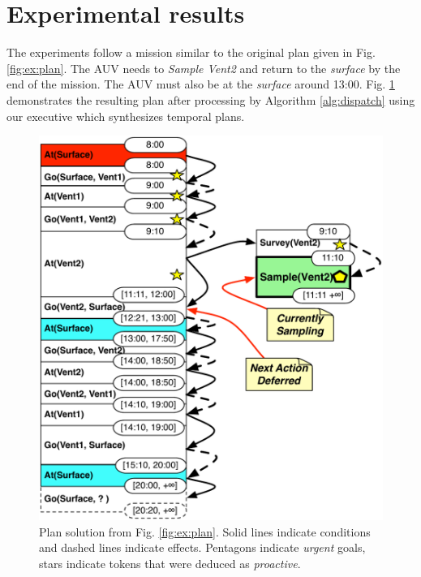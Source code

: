 \section{Experimental results}
\label{sec:exp}

The experiments follow a mission similar to the original plan given in
Fig. \ref{fig:ex:plan}. The AUV needs to {\em Sample Vent2} and return
to the {\em surface} by the end of the mission. The AUV must also be
at the {\em surface} around
13:00. %
Fig. \ref{fig:ex:mixed1} demonstrates the resulting plan after
processing by Algorithm \ref{alg:dispatch} using our executive \rx
which synthesizes temporal plans.

\begin{figure}[!htbp]
  \centering
  \includegraphics[width=0.9\columnwidth]{figs/example_MixedInitial}
  \caption{\small Plan solution from Fig. \ref{fig:ex:plan}. Solid
    lines indicate conditions and dashed lines indicate
    effects. Pentagons indicate {\em urgent} goals, stars indicate
    tokens that were deduced as {\em proactive}.}
  \label{fig:ex:mixed1}
\end{figure}


